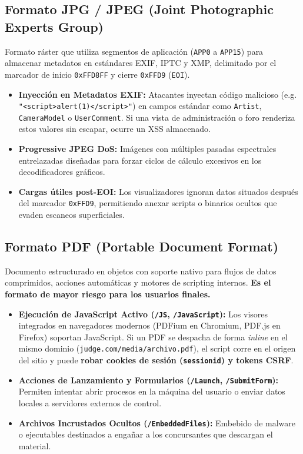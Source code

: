 \documentclass[11pt,a4paper]{article}
\begin{document}
\subsection{Formato JPG / JPEG (Joint Photographic Experts Group)}
Formato ráster que utiliza segmentos de aplicación (\texttt{APP0} a \texttt{APP15}) para almacenar metadatos en estándares EXIF, IPTC y XMP, delimitado por el marcador de inicio \texttt{0xFFD8FF} y cierre \texttt{0xFFD9} (\texttt{EOI}).
\begin{itemize}
    \item \textbf{Inyección en Metadatos EXIF:} Atacantes inyectan código malicioso (e.g. \texttt{"\textless script\textgreater alert(1)\textless/script\textgreater"}) en campos estándar como \texttt{Artist}, \texttt{CameraModel} o \texttt{UserComment}. Si una vista de administración o foro renderiza estos valores sin escapar, ocurre un XSS almacenado.
    \item \textbf{Progressive JPEG DoS:} Imágenes con múltiples pasadas espectrales entrelazadas diseñadas para forzar ciclos de cálculo excesivos en los decodificadores gráficos.
    \item \textbf{Cargas útiles post-EOI:} Los visualizadores ignoran datos situados después del marcador \texttt{0xFFD9}, permitiendo anexar scripts o binarios ocultos que evaden escaneos superficiales.
\end{itemize}

\subsection{Formato PDF (Portable Document Format)}
Documento estructurado en objetos con soporte nativo para flujos de datos comprimidos, acciones automáticas y motores de scripting internos. \textbf{Es el formato de mayor riesgo para los usuarios finales.}
\begin{itemize}
    \item \textbf{Ejecución de JavaScript Activo (\texttt{/JS}, \texttt{/JavaScript}):} Los visores integrados en navegadores modernos (PDFium en Chromium, PDF.js en Firefox) soportan JavaScript. Si un PDF se despacha de forma \textit{inline} en el mismo dominio (\texttt{judge.com/media/archivo.pdf}), el script corre en el origen del sitio y puede \textbf{robar cookies de sesión (\texttt{sessionid}) y tokens CSRF}.
    \item \textbf{Acciones de Lanzamiento y Formularios (\texttt{/Launch}, \texttt{/SubmitForm}):} Permiten intentar abrir procesos en la máquina del usuario o enviar datos locales a servidores externos de control.
    \item \textbf{Archivos Incrustados Ocultos (\texttt{/EmbeddedFiles}):} Embebido de malware o ejecutables destinados a engañar a los concursantes que descargan el material.
\end{itemize}
\end{document}

